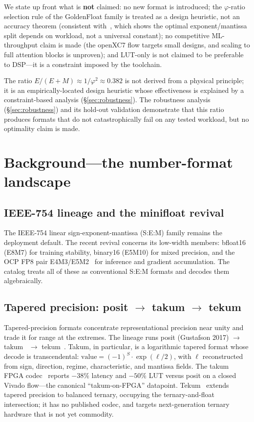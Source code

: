 \documentclass[11pt]{article}
\begin{document}
We state up front what is \textbf{not} claimed: no new format is introduced;
the $\varphi$-ratio selection rule of the GoldenFloat family is treated as a
design heuristic, not an accuracy theorem (consistent
with~\cite{kuzmin2022fp8quant}, which shows the optimal exponent/mantissa split
depends on workload, not a universal constant); no competitive ML-throughput
claim is made (the openXC7 flow targets small designs, and scaling to full
attention blocks is unproven); and LUT-only is not claimed to be preferable to
DSP---it is a constraint imposed by the toolchain.

The ratio $E/(E{+}M) \approx 1/\varphi^{2} \approx 0.382$ is not derived from a
physical principle; it is an empirically-located design heuristic whose effectiveness is explained by a constraint-based analysis (\S\ref{sec:robustness}). The robustness
analysis (\S\ref{sec:robustness}) and its hold-out validation demonstrate that
this ratio produces formats that do not catastrophically fail on any tested
workload, but no optimality claim is made.

\section{Background---the number-format landscape}\label{sec:background}

\subsection{IEEE-754 lineage and the minifloat revival}

The IEEE-754 linear sign-exponent-mantissa (S:E:M) family remains the
deployment default. The recent revival concerns its low-width members: bfloat16
(E8M7) for training stability, binary16 (E5M10) for mixed precision, and the
OCP FP8 pair E4M3/E5M2~\cite{micikevicius2022fp8} for inference and gradient
accumulation. The catalog treats all of these as conventional S:E:M formats and
decodes them algebraically.

\subsection{Tapered precision: posit $\to$ takum $\to$ tekum}

Tapered-precision formats concentrate representational precision near unity and
trade it for range at the extremes. The lineage runs posit (Gustafson 2017)
$\to$ takum~\cite{hunhold2024takum} $\to$ tekum~\cite{hunhold2025tekum}. Takum,
in particular, is a logarithmic tapered format whose decode is transcendental:
$\text{value} = (-1)^{S} \cdot \exp(\ell/2)$, with $\ell$ reconstructed from
sign, direction, regime, characteristic, and mantissa fields. The takum FPGA
codec~\cite{hunhold2024takumcodec} reports $-38\%$ latency and $-50\%$ LUT
versus posit on a closed Vivado flow---the canonical ``takum-on-FPGA''
datapoint. Tekum~\cite{hunhold2025tekum} extends tapered precision to balanced
ternary, occupying the ternary-and-float intersection; it has no published
codec, and targets next-generation ternary hardware that is not yet commodity.
\end{document}
